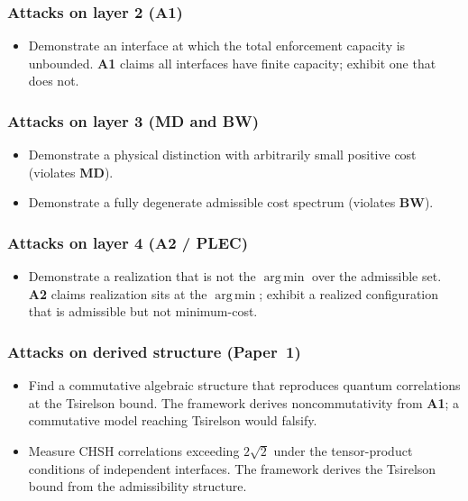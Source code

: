 \documentclass[11pt]{article}
\newcommand{\Aone}{\textbf{A1}}
\newcommand{\PLEC}{\textbf{PLEC}}
\newcommand{\argmin}{\mathop{\mathrm{arg\,min}}}
\begin{document}
\subsubsection*{Attacks on layer 2 (\Aone{})}

\begin{itemize}
    \item Demonstrate an interface at which the total enforcement capacity is unbounded. \Aone{} claims all interfaces have finite capacity; exhibit one that does not.
\end{itemize}

\subsubsection*{Attacks on layer 3 (\textbf{MD} and \textbf{BW})}

\begin{itemize}
    \item Demonstrate a physical distinction with arbitrarily small positive cost (violates \textbf{MD}).
    \item Demonstrate a fully degenerate admissible cost spectrum (violates \textbf{BW}).
\end{itemize}

\subsubsection*{Attacks on layer 4 (\textbf{A2} / \PLEC{})}

\begin{itemize}
    \item Demonstrate a realization that is not the $\argmin$ over the admissible set. \textbf{A2} claims realization sits at the $\argmin$; exhibit a realized configuration that is admissible but not minimum-cost.
\end{itemize}

\subsubsection*{Attacks on derived structure (Paper~1)}

\begin{itemize}
    \item Find a commutative algebraic structure that reproduces quantum correlations at the Tsirelson bound. The framework derives noncommutativity from \Aone{}; a commutative model reaching Tsirelson would falsify.
    \item Measure CHSH correlations exceeding $2\sqrt{2}$ under the tensor-product conditions of independent interfaces. The framework derives the Tsirelson bound from the admissibility structure.
\end{itemize}
\end{document}
